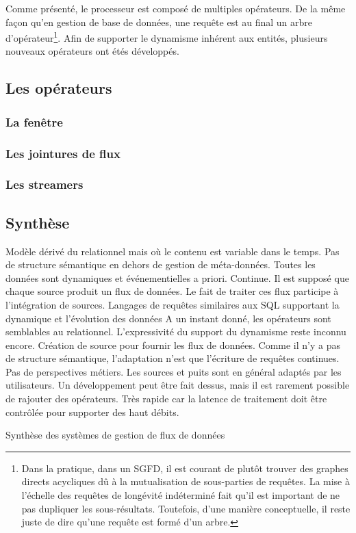 Comme présenté, le processeur est composé de multiples opérateurs. De la même façon qu'en gestion de base de données, une requête est au final un arbre d'opérateur\footnote{Dans la pratique, dans un SGFD, il est courant de plutôt trouver des graphes directs acycliques dû à la mutualisation de sous-parties de requêtes. La mise à l'échelle des requêtes de longévité indéterminé fait qu'il est important de ne pas dupliquer les sous-résultats. Toutefois, d'une manière conceptuelle, il reste juste de dire qu'une requête est formé d'un arbre.}.
Afin de supporter le dynamisme inhérent aux entités, plusieurs nouveaux opérateurs ont étés développés.

\subsection{Les opérateurs}
\subsubsection{La fenêtre}
\subsubsection{Les jointures de flux}
\subsubsection{Les streamers}

\subsection{Synthèse}
\begin{table}[!ht]
\criteretabDonnee
    {Modèle dérivé du relationnel mais où le contenu est variable dans le temps.}
    {Pas de structure sémantique en dehors de gestion de méta-données.}
    {Toutes les données sont dynamiques et événementielles a priori.}
\criteretabTraitement
    {Continue.}
    {Il est supposé que chaque source produit un flux de données. Le fait de traiter ces flux participe à l'intégration de sources.}
    {Langages de requêtes similaires aux SQL supportant la dynamique et l'évolution des données}
    {A un instant donné, les opérateurs sont semblables au relationnel. L'expressivité du support du dynamisme reste inconnu encore.}
\criteretabAdaptabilite
    {Création de source pour fournir les flux de données. Comme il n'y a pas de structure sémantique, l'adaptation n'est que l'écriture de requêtes continues.}
    {Pas de perspectives métiers.}
    {Les sources et puits sont en général adaptés par les utilisateurs. Un développement peut être fait dessus, mais il est rarement possible de rajouter des opérateurs.}
    {Très rapide car la latence de traitement doit être contrôlée pour supporter des haut débits.}
\caption{Synthèse des systèmes de gestion de flux de données}\label{tab:rw:supervision:sgfd:synthese}
\end{table}
